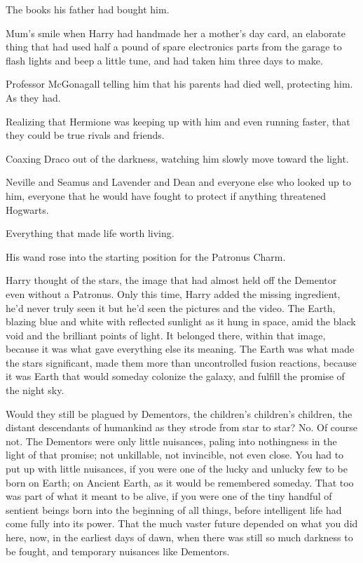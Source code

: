 The books his father had bought him.

Mum's smile when Harry had handmade her a mother's day card, an
elaborate thing that had used half a pound of spare electronics parts
from the garage to flash lights and beep a little tune, and had taken
him three days to make.

Professor McGonagall telling him that his parents had died well,
protecting him. As they had.

Realizing that Hermione was keeping up with him and even running faster,
that they could be true rivals and friends.

Coaxing Draco out of the darkness, watching him slowly move toward the
light.

Neville and Seamus and Lavender and Dean and everyone else who looked up
to him, everyone that he would have fought to protect if anything
threatened Hogwarts.

Everything that made life worth living.

His wand rose into the starting position for the Patronus Charm.

Harry thought of the stars, the image that had almost held off the
Dementor even without a Patronus. Only this time, Harry added the
missing ingredient, he'd never truly seen it but he'd seen the pictures
and the video. The Earth, blazing blue and white with reflected sunlight
as it hung in space, amid the black void and the brilliant points of
light. It belonged there, within that image, because it was what gave
everything else its meaning. The Earth was what made the stars
significant, made them more than uncontrolled fusion reactions, because
it was Earth that would someday colonize the galaxy, and fulfill the
promise of the night sky.

Would they still be plagued by Dementors, the children's children's
children, the distant descendants of humankind as they strode from star
to star? No. Of course not. The Dementors were only little nuisances,
paling into nothingness in the light of that promise; not unkillable,
not invincible, not even close. You had to put up with little nuisances,
if you were one of the lucky and unlucky few to be born on Earth; on
Ancient Earth, as it would be remembered someday. That too was part of
what it meant to be alive, if you were one of the tiny handful of
sentient beings born into the beginning of all things, before
intelligent life had come fully into its power. That the much vaster
future depended on what you did here, now, in the earliest days of dawn,
when there was still so much darkness to be fought, and temporary
nuisances like Dementors.

